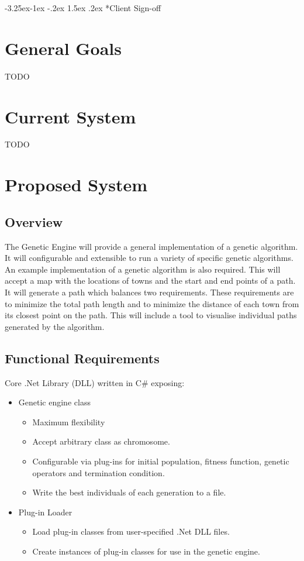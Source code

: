 \documentclass[a4paper]{article}
\makeatletter
\renewcommand\paragraph{\@startsection{paragraph}{4}{\z@}%
  {-3.25ex\@plus -1ex \@minus -.2ex}%
  {1.5ex \@plus .2ex}%
  {\normalfont\normalsize\bfseries}}
\makeatother
\begin{document}
\paragraph*{Client Sign-off}


\section{General Goals}
TODO


\section{Current System}
TODO


\section{Proposed System}
\subsection{Overview}
The Genetic Engine will provide a general implementation of a genetic algorithm. It will configurable and extensible to run a variety of specific genetic algorithms.
An example implementation of a genetic algorithm is also required. This will accept a map with the locations of towns and the start and end points of a path. It will generate a path which balances two requirements. These requirements are to minimize the total path length and to minimize the distance of each town from its closest point on the path. This will include a tool to visualise individual paths generated by the algorithm.

\subsection{Functional Requirements}
Core .Net Library (DLL) written in C\# exposing:
\begin{itemize}
 \item Genetic engine class
 \begin{itemize}
  \item Maximum flexibility
  \item Accept arbitrary class as chromosome.
  \item Configurable via plug-ins for initial population, fitness function, genetic operators and termination condition.
  \item Write the best individuals of each generation to a file.
 \end{itemize}
 \item Plug-in Loader
 \begin{itemize}
  \item Load plug-in classes from user-specified .Net DLL files.
  \item Create instances of plug-in classes for use in the genetic engine.
 \end{itemize}
\end{itemize}
\end{document}
